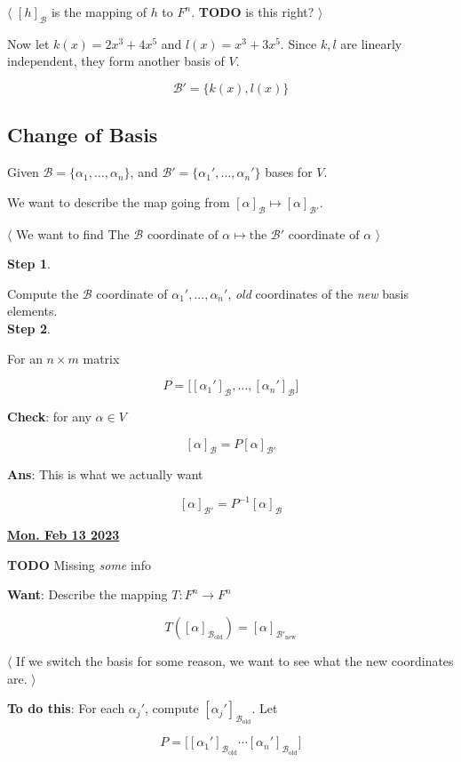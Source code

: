 \documentclass[12pt]{article}
\def\B{\mathcal B}
\newcommand{\btw}[1]{
    $\langle$ #1 $\rangle$
}
\renewcommand{\date}[1]{\underline{\bf #1}}
\newcommand{\TODO}{\color{red}\textbf{TODO}\color{black}}
\begin{document}
    \btw {
      $[h]_{\B}$ is the mapping of $h$ to $F^n$. \TODO{} is this right?
    }

    Now let $k(x) = 2x^3 + 4x^5$ and $l(x) = x^3 + 3x^5$. Since $k, l$ are
    linearly independent, they form another basis of $V$.

    \[
      \B' = \{k(x), l(x)\}
    \]

    \subsection{Change of Basis}

    Given $\B = \{\alpha_1, \dots, \alpha_n\}$, and $\B' = \{\alpha_1', ...,
    \alpha_n'\}$ bases for $V$.

    We want to describe the map going from $[\alpha]_{\B} \mapsto
    [\alpha]_{\B'}$.

    \btw{ We want to find $\text{The $\B$ coordinate of $\alpha$} \mapsto
    \text{the $\B'$ coordinate of $\alpha$}$}

    {\bf Step 1}.

    Compute the $\B$ coordinate of $\alpha_1', ..., \alpha_n'$, {\it old}
    coordinates of the {\it new} basis elements. \\

    {\bf Step 2}.

    For an $n \times m$ matrix

    \[
      P = \Big[ [\alpha_1']_{\B}, \dots, [\alpha_n']_{\B} \Big]
    \]

    {\bf Check}: for any $\alpha \in V$

    \[
      [\alpha]_{\B} = P [\alpha]_{\B'}
    \]

    {\bf Ans}: This is what we actually want

    \[
      [\alpha]_{\B'} = P^{-1} [\alpha]_{\B}
    \]

    \date{Mon. Feb 13 2023}

    \TODO{} Missing {\it some} info

    {\bf Want}: Describe the mapping $T: F^n \to F^n$

    \[
      T([\alpha]_{\B_\text{old}}) = [\alpha]_{\B'_{\text{new}}}
    \]

    \btw {
      If we switch the basis for some reason, we want to see what the new
      coordinates are.
    }

    {\bf To do this}: For each $\alpha_j'$, compute
    $[\alpha_j']_{\B_\text{old}}$. Let

    \[
      P = \Big[[\alpha_1']_{\B_\text{old}} \cdots [\alpha_n']_{\B_{\text{old}}}\Big]
    \]
\end{document}
